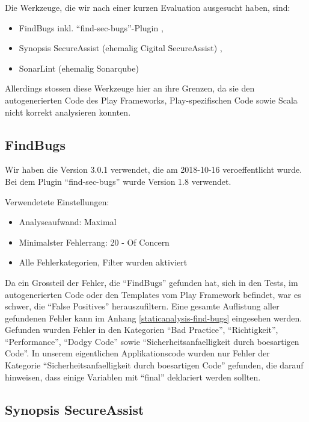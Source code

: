 \documentclass[12pt,DIV14,BCOR10mm,a4paper,twoside,parskip=half-,headsepline,headinclude,english,ngerman,bibliography=totocnumbered]{scrreprt}
\begin{document}
Die Werkzeuge, die wir nach einer kurzen Evaluation ausgesucht haben, sind:

\begin{itemize}
  \item FindBugs \autocite{FindBugs} inkl. \enquote{find-sec-bugs}-Plugin \autocite{FindBugs.FindSecBugs},
  \item Synopsis SecureAssist (ehemalig Cigital SecureAssist) \autocite{SecureAssist},
  \item SonarLint (ehemalig Sonarqube) \autocite{SonarLint}
\end{itemize}

Allerdings stossen diese Werkzeuge hier an ihre Grenzen, da sie den autogenerierten Code des Play Frameworks, Play-spezifischen Code sowie Scala nicht korrekt analysieren konnten.

\subsection{FindBugs}

Wir haben die Version 3.0.1 verwendet, die am 2018-10-16 veroeffentlicht wurde.
Bei dem Plugin \enquote{find-sec-bugs} wurde Version 1.8 verwendet.

Verwendetete Einstellungen:

\begin{itemize}
  \item Analyseaufwand: Maximal
  \item Minimalster Fehlerrang: 20 - Of Concern
  \item Alle Fehlerkategorien, Filter wurden aktiviert
\end{itemize}

Da ein Grossteil der Fehler, die \enquote{FindBugs} gefunden hat, sich in den Tests, im autogenerierten Code oder den Templates vom Play Framework befindet, war es schwer, die \enquote{False Positives} herauszufiltern.
Eine gesamte Auflistung aller gefundenen Fehler kann im Anhang \ref{staticanalysis-find-bugs} eingesehen werden.
Gefunden wurden Fehler in den Kategorien \enquote{Bad Practice}, \enquote{Richtigkeit}, \enquote{Performance}, \enquote{Dodgy Code} sowie \enquote{Sicherheitsanfaelligkeit durch boesartigen Code}.
In unserem eigentlichen Applikationscode wurden nur Fehler der Kategorie \enquote{Sicherheitsanfaelligkeit durch boesartigen Code} gefunden, die darauf hinweisen, dass einige Variablen mit \enquote{final} deklariert werden sollten.

\subsection{Synopsis SecureAssist}
\end{document}
